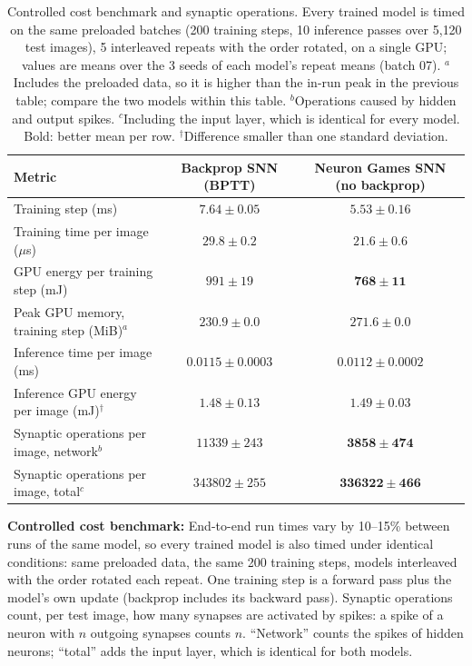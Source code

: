 \documentclass{article}
\begin{document}
\begin{table}[H]
\centering
\small
\caption{Controlled cost benchmark and synaptic operations. Every trained model is timed on the same preloaded batches (200 training steps, 10 inference passes over 5{,}120 test images), 5 interleaved repeats with the order rotated, on a single GPU; values are means over the 3 seeds of each model's repeat means (batch 07). $^a$Includes the preloaded data, so it is higher than the in-run peak in the previous table; compare the two models within this table. $^b$Operations caused by hidden and output spikes. $^c$Including the input layer, which is identical for every model. Bold: better mean per row. $^\dagger$Difference smaller than one standard deviation.}
\label{tab:t1-bench}
\begin{tabular}{lcc}
\toprule
Metric & Backprop SNN (BPTT) & Neuron Games SNN (no backprop) \\
\midrule
Training step (ms) & $7.64 \pm 0.05$ & $\boldsymbol{5.53 \pm 0.16}$ \\
Training time per image ($\mu$s) & $29.8 \pm 0.2$ & $\boldsymbol{21.6 \pm 0.6}$ \\
GPU energy per training step (mJ) & $991 \pm 19$ & $\boldsymbol{768 \pm 11}$ \\
Peak GPU memory, training step (MiB)$^a$ & $\boldsymbol{230.9 \pm 0.0}$ & $271.6 \pm 0.0$ \\
Inference time per image (ms) & $0.0115 \pm 0.0003$ & $\boldsymbol{0.0112 \pm 0.0002}$ \\
Inference GPU energy per image (mJ)$^\dagger$ & $\boldsymbol{1.48 \pm 0.13}$ & $1.49 \pm 0.03$ \\
\midrule
Synaptic operations per image, network$^b$ & $11339 \pm 243$ & $\boldsymbol{3858 \pm 474}$ \\
Synaptic operations per image, total$^c$ & $343802 \pm 255$ & $\boldsymbol{336322 \pm 466}$ \\
\bottomrule
\end{tabular}
\end{table}

{\small
\noindent\textbf{Controlled cost benchmark:} End-to-end run times vary by 10--15\% between runs of the same model,
so every trained model is also timed under identical conditions: same preloaded data, the same 200 training steps,
models interleaved with the order rotated each repeat. One training step is a forward pass plus the model's own
update (backprop includes its backward pass). Synaptic operations count, per test image, how many synapses are
activated by spikes: a spike of a neuron with $n$ outgoing synapses counts $n$. ``Network'' counts the spikes of
hidden neurons; ``total'' adds the input layer, which is identical for both models.
}
\end{document}
